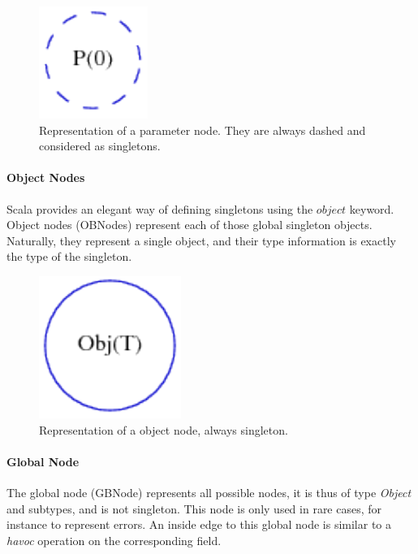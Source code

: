 \begin{figure}[h]
    \centering

    \includegraphics{images/pt_pnodes}

    \caption{Representation of a parameter node. They are always dashed and
    considered as singletons.}
    \label{fig:pt:pnodes}
\end{figure}

\paragraph{Object Nodes} Scala provides an elegant way of defining singletons
using the $object$ keyword. Object nodes (OBNodes) represent each of those
global singleton objects. Naturally, they represent a single object, and their
type information is exactly the type of the singleton.

\begin{figure}[h]
    \centering

    \includegraphics{images/pt_obnodes}

    \caption{Representation of a object node, always singleton.}
    \label{fig:pt:obnodes}
\end{figure}

\paragraph{Global Node} The global node (GBNode) represents all possible nodes,
it is thus of type \emph{Object} and subtypes, and is not singleton. This node
is only used in rare cases, for instance to represent errors. An inside edge to
this global node is similar to a \emph{havoc} operation on the
corresponding field.

